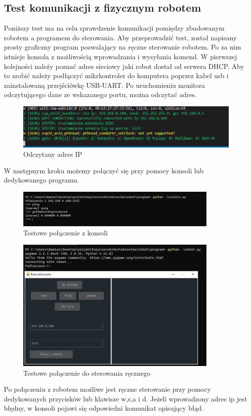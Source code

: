 \subsection{Test komunikacji z fizycznym robotem}
Poniższy test ma na celu sprawdzenie komunikacji pomiędzy zbudowanym robotem a programem do sterowania. 
Aby przeprowadzić test, został napisany prosty graficzny program pozwalający na ręczne sterowanie robotem. 
Po za nim istnieje konsola z możliwością wprowadzania i wysyłania komend.
W pierwszej kolejności należy poznać adres sieciowy jaki robot dostał od serwera DHCP. Aby to zrobić 
należy podłączyć mikrkontroler do komputera poprzez kabel usb i zainstalowaną przejściówkę USB-UART. 
Po uruchomieniu monitora odczytującego dane ze wskazanego portu, można odczytać adres. 
\begin{figure}[H]
	\centering
	\includegraphics[width=13cm]{pages/testy/zdjecia/testSiec/idfMonitorIP.png}
	\caption{Odczytany adres IP}
\end{figure}
W następnym kroku możemy połączyć się przy pomocy konsoli lub dedykowanego programu. 
\begin{figure}[H]
	\centering
	\includegraphics[width=10cm]{pages/testy/zdjecia/testSiec/testSiecKonsolePing.png}
	\caption{Testowe połączenie z konsoli}
\end{figure}

\begin{figure}[H]
	\centering
	\includegraphics[width=10cm]{pages/testy/zdjecia/testSiec/testSterowanieReczne.png}
	\caption{Testowe połączenie do sterowania ręcznego}
\end{figure}

Po połączeniu z robotem możliwe jest ręczne sterowanie przy pomocy dedykowanych przycisków lub klawisze w,s,a i d.
Jeżeli wprowadzony adres ip jest błędny, w konsoli pojawi się odpowiedni komunikat opisujący błąd. 